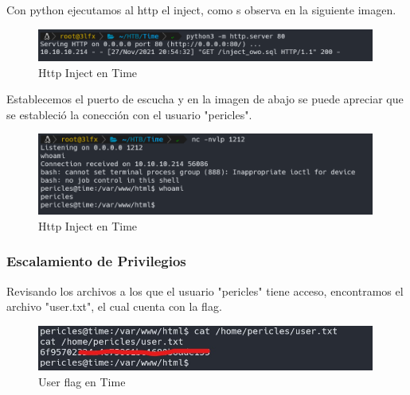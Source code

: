         \large{Con python ejecutamos al http el inject, como s observa en la siguiente imagen.}
        \par
        \begin{figure}[H]
            \centering
            \includegraphics[width=0.99\textwidth]{imagenes/time/06_http_inject_time.png}
            \caption{Http Inject en Time}
        \end{figure}

        \large{Establecemos el puerto de escucha y en la imagen de abajo se puede apreciar que se estableció la conección con el usuario "pericles".}
        \par
        \begin{figure}[H]
            \centering
            \includegraphics[width=0.99\textwidth]{imagenes/time/07_conect_pericles_time.png}
            \caption{Http Inject en Time}
        \end{figure}

    \subsubsection{Escalamiento de Privilegios}

        \large{Revisando los archivos a los que el usuario "pericles" tiene acceso, encontramos el archivo "user.txt", el cual cuenta con la flag.}
        \par
        \begin{figure}[H]
            \centering
            \includegraphics[width=0.99\textwidth]{imagenes/time/08_user_flag_time.jpg}
            \caption{User flag en Time}
        \end{figure}

